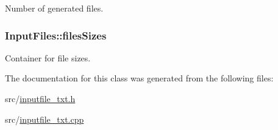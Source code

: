 Number of generated files. 

\hypertarget{class_input_files_a2d6426414a58ca39751e3b26135341e0}{}
\subsubsection[{files\+Sizes}]{\setlength{\rightskip}{0pt plus 5cm}Input\+Files\+::files\+Sizes\hspace{0.3cm}{\ttfamily [private]}}\label{class_input_files_a2d6426414a58ca39751e3b26135341e0}


Container for file sizes. 



The documentation for this class was generated from the following files\+:\begin{DoxyCompactItemize}
\item 
src/\hyperlink{inputfile__txt_8h}{inputfile\+\_\+txt.\+h}\item 
src/\hyperlink{inputfile__txt_8cpp}{inputfile\+\_\+txt.\+cpp}\end{DoxyCompactItemize}
